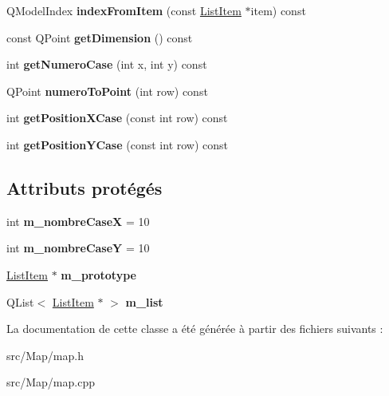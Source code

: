 \begin{DoxyCompactItemize}
\item 
Q\+Model\+Index {\bfseries index\+From\+Item} (const \hyperlink{class_list_item}{List\+Item} $\ast$item) const \hypertarget{class_map_adae15160f37ac4a09801fd15796d1e57}{}\label{class_map_adae15160f37ac4a09801fd15796d1e57}

\item 
const Q\+Point {\bfseries get\+Dimension} () const \hypertarget{class_map_acb765f109d081944a6306353887f6dcb}{}\label{class_map_acb765f109d081944a6306353887f6dcb}

\item 
int {\bfseries get\+Numero\+Case} (int x, int y) const \hypertarget{class_map_a2804b547704936362ffe8524b5cf4660}{}\label{class_map_a2804b547704936362ffe8524b5cf4660}

\item 
Q\+Point {\bfseries numero\+To\+Point} (int row) const \hypertarget{class_map_a2332ec063b663fb4e7538d9ba8710fb9}{}\label{class_map_a2332ec063b663fb4e7538d9ba8710fb9}

\item 
int {\bfseries get\+Position\+X\+Case} (const int row) const \hypertarget{class_map_aae779485d40677d883c78519f03cc201}{}\label{class_map_aae779485d40677d883c78519f03cc201}

\item 
int {\bfseries get\+Position\+Y\+Case} (const int row) const \hypertarget{class_map_aeb554e4ad8cfd88fbccc852fe053cceb}{}\label{class_map_aeb554e4ad8cfd88fbccc852fe053cceb}

\end{DoxyCompactItemize}
\subsection*{Attributs protégés}
\begin{DoxyCompactItemize}
\item 
int {\bfseries m\+\_\+nombre\+CaseX} = 10\hypertarget{class_map_aa98f997bd04845e62939393f5bda5d15}{}\label{class_map_aa98f997bd04845e62939393f5bda5d15}

\item 
int {\bfseries m\+\_\+nombre\+CaseY} = 10\hypertarget{class_map_a4210d7c188fe60b5d11397ed3b15f09f}{}\label{class_map_a4210d7c188fe60b5d11397ed3b15f09f}

\item 
\hyperlink{class_list_item}{List\+Item} $\ast$ {\bfseries m\+\_\+prototype}\hypertarget{class_map_a86942d2fe84df1a8bf328d0003e3c8e2}{}\label{class_map_a86942d2fe84df1a8bf328d0003e3c8e2}

\item 
Q\+List$<$ \hyperlink{class_list_item}{List\+Item} $\ast$ $>$ {\bfseries m\+\_\+list}\hypertarget{class_map_a7cb44ec468ecd634f6a6390664a596e7}{}\label{class_map_a7cb44ec468ecd634f6a6390664a596e7}

\end{DoxyCompactItemize}


La documentation de cette classe a été générée à partir des fichiers suivants \+:\begin{DoxyCompactItemize}
\item 
src/\+Map/map.\+h\item 
src/\+Map/map.\+cpp\end{DoxyCompactItemize}
